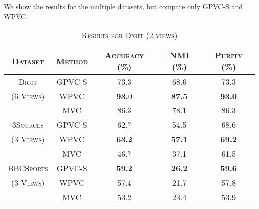\documentclass[a4paper]{article}
\begin{document}
	We show the results for the multiple datasets, but compare only GPVC-S and WPVC,	
	\begin{table}[h!]
	  \begin{center}
	    \begin{tabular}{c|c|c|c|c}
	      \toprule
		  \textsc{Dataset} & \textsc{Method} & \textsc{Accuracy (\%) } & \textsc{NMI (\%) } 
	      & \textsc{Purity (\%)} 	\\
            
		  \midrule
			\textsc{Digit} & \textsc{GPVC-S} & 73.3 & 68.6 & 73.3\\  
			\footnotesize\textsc{(6 Views)} & \textsc{WPVC} & \textbf{93.0} & \textbf{87.5} & \textbf{93.0}\\
			& \textsc{MVC} & 86.3 & 78.1 & 86.3\\  
		  \midrule
	    	\textsc{3Sources} & \textsc{GPVC-S} & 62.7 & 54.5 & 68.6\\  
			\footnotesize\textsc{(3 Views)} & \textsc{WPVC} & \textbf{63.2} & \textbf{57.1} & \textbf{69.2}\\
			& \textsc{MVC} & 46.7 & 37.1 & 61.5\\  
		  \midrule
	    	\textsc{BBCSports} & \textsc{GPVC-S} & \textbf{59.2} & \textbf{26.2} & \textbf{59.6}\\  
			\footnotesize\textsc{(3 Views)} & \textsc{WPVC} & {57.4} & {21.7} & {57.8}\\
			& \textsc{MVC} & 53.2 & 23.4 & 53.9\\  
		  \midrule

	    \end{tabular}
	    \caption*{\textsc{Results for Digit (2 views)}}
	  \end{center}
	\end{table}		



	\restoregeometry	
	
\end{document}
